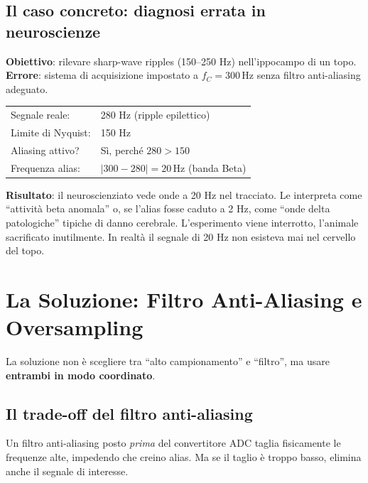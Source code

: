 \documentclass[12pt,a4paper]{article}
\begin{document}
\subsection{Il caso concreto: diagnosi errata in neuroscienze}

\begin{examplebox}
\textbf{Obiettivo}: rilevare sharp-wave ripples (150--250 Hz) nell'ippocampo di un topo.\\
\textbf{Errore}: sistema di acquisizione impostato a $f_C = 300\,\text{Hz}$ senza filtro
anti-aliasing adeguato.

\medskip
\begin{tabular}{ll}
  Segnale reale: & 280 Hz (ripple epilettico) \\
  Limite di Nyquist: & 150 Hz \\
  Aliasing attivo? & Sì, perché $280 > 150$ \\
  Frequenza alias: & $|300 - 280| = 20\,\text{Hz}$ (banda Beta) \\
\end{tabular}

\medskip
\textbf{Risultato}: il neuroscienziato vede onde a 20 Hz nel tracciato. Le interpreta come
``attività beta anomala'' o, se l'alias fosse caduto a 2 Hz, come ``onde delta patologiche''
tipiche di danno cerebrale. L'esperimento viene interrotto, l'animale sacrificato inutilmente.
In realtà il segnale di 20 Hz non esisteva mai nel cervello del topo.
\end{examplebox}

\section{La Soluzione: Filtro Anti-Aliasing e Oversampling}

La soluzione non è scegliere tra ``alto campionamento'' e ``filtro'', ma usare \textbf{entrambi
in modo coordinato}.

\subsection{Il trade-off del filtro anti-aliasing}

Un filtro anti-aliasing posto \emph{prima} del convertitore ADC taglia fisicamente le frequenze
alte, impedendo che creino alias. Ma se il taglio è troppo basso, elimina anche il segnale
di interesse.
\end{document}
